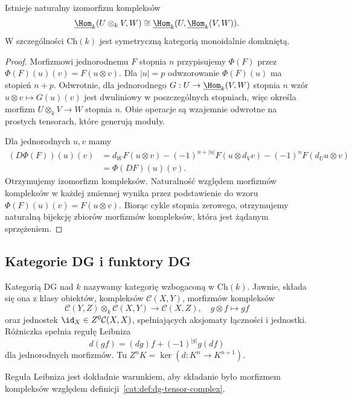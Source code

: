 \begin{twierdzenie}\label{cat:thm:dg-tensor-hom}
Istnieje naturalny izomorfizm kompleksów
\[
 \underline{\Hom}_k(U\otimes_k V,W)
 \cong
 \underline{\Hom}_k(U,\underline{\Hom}_k(V,W)).
\]
W szczególności $\mathrm{Ch}(k)$ jest symetryczną kategorią monoidalnie domkniętą.
\end{twierdzenie}
\begin{proof}
Morfizmowi jednorodnemu $F$ stopnia $n$ przypisujemy $\Phi(F)$ przez
$\Phi(F)(u)(v)=F(u\otimes v)$. Dla $|u|=p$ odwzorowanie $\Phi(F)(u)$ ma stopień $n+p$. Odwrotnie, dla jednorodnego $G:U\to\underline{\Hom}_k(V,W)$ stopnia $n$ wzór $u\otimes v\mapsto G(u)(v)$ jest dwuliniowy w poszczególnych stopniach, więc określa morfizm $U\otimes_k V\to W$ stopnia $n$. Obie operacje są wzajemnie odwrotne na prostych tensorach, które generują moduły.

Dla jednorodnych $u,v$ mamy
\[
\begin{aligned}
 (D\Phi(F))(u)(v)
 &=d_W F(u\otimes v)
 -(-1)^{n+|u|}F(u\otimes d_Vv)
 -(-1)^nF(d_Uu\otimes v)\\
 &=\Phi(DF)(u)(v).
\end{aligned}
\]
Otrzymujemy izomorfizm kompleksów. Naturalność względem morfizmów kompleksów w każdej zmiennej wynika przez podstawienie do wzoru $\Phi(F)(u)(v)=F(u\otimes v)$. Biorąc cykle stopnia zerowego, otrzymujemy naturalną bijekcję zbiorów morfizmów kompleksów, która jest żądanym sprzężeniem.
\end{proof}

\subsection{Kategorie DG i funktory DG}

\begin{definicja}[Kategoria DG]\label{cat:def:dg-category}
Kategorią DG nad $k$ nazywamy kategorię wzbogaconą w $\mathrm{Ch}(k)$. Jawnie, składa się ona z klasy obiektów, kompleksów $\mathcal C(X,Y)$, morfizmów kompleksów
\[
 \mathcal C(Y,Z)\otimes_k\mathcal C(X,Y)
 \longrightarrow\mathcal C(X,Z),\quad g\otimes f\longmapsto gf
\]
oraz jednostek $\id_X\in Z^0\mathcal C(X,X)$, spełniających aksjomaty łączności i jednostki. Różniczka spełnia regułę Leibniza
\[
 d(gf)=(dg)f+(-1)^{|g|}g(df)
\]
dla jednorodnych morfizmów. Tu $Z^n K=\ker(d:K^n\to K^{n+1})$.
\end{definicja}

Reguła Leibniza jest dokładnie warunkiem, aby składanie było morfizmem kompleksów względem definicji~\ref{cat:def:dg-tensor-complex}.

